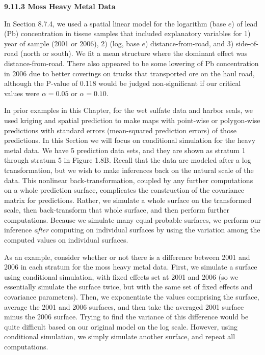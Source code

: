 \documentclass[12pt, titlepage]{article}
\begin{document}
\setcounter{equation}{0}
\renewcommand{\theequation}{R.\arabic{equation}}


%
%

{\large \flushleft \textbf{9.11.3 Moss Heavy Metal Data}}

\vspace{.3cm}

In Section 8.7.4, we used a spatial linear model for the logarithm (base $e$) of lead (Pb) concentration in tissue samples that included explanatory variables for 1) year of sample (2001 or 2006), 2) (log, base $e$) distance-from-road, and 3) side-of-road (north or south).  We fit a mean structure where the dominant effect was distance-from-road. There also appeared to be some lowering of Pb concentration in 2006 due to better coverings on trucks that transported ore on the haul road, although the P-value of 0.118 would be judged non-significant if our critical values were $\alpha = 0.05$ or $\alpha = 0.10$. 

In prior examples in this Chapter, for the wet sulfate data and harbor seals, we used kriging and spatial prediction to make maps with point-wise or polygon-wise predictions with standard errors (mean-squared prediction errors) of those predictions.  In this Section we will focus on conditional simulation for the heavy metal data.  We have 5 prediction data sets, and they are shown as stratum 1 through stratum 5 in Figure 1.8B.  Recall that the data are modeled after a log transformation, but we wish to make inferences back on the natural scale of the data.  This nonlinear back-transformation, coupled by any further computations on a whole prediction surface, complicates the construction of the covariance matrix for predictions.  Rather, we simulate a whole surface on the transformed scale, then back-transform that whole surface, and then perform further computations.  Because we simulate many equal-probable surfaces, we perform our inference \textit{after} computing on individual surfaces by using the variation among the computed values on individual surfaces.

As an example, consider whether or not there is a difference between 2001 and 2006 in each stratum for the moss heavy metal data.  First, we simulate a surface using conditional simulation, with fixed effects set at 2001 and 2006 (so we essentially simulate the surface twice, but with the same set of fixed effects and covariance parameters).  Then, we exponentiate the values comprising the surface, average the 2001 and 2006 surfaces, and then take the averaged 2001 surface minus the 2006 surface.  Trying to find the variance of this difference would be quite difficult based on our original model on the log scale.  However, using conditional simulation, we simply simulate another surface, and repeat all computations.  
\end{document}
